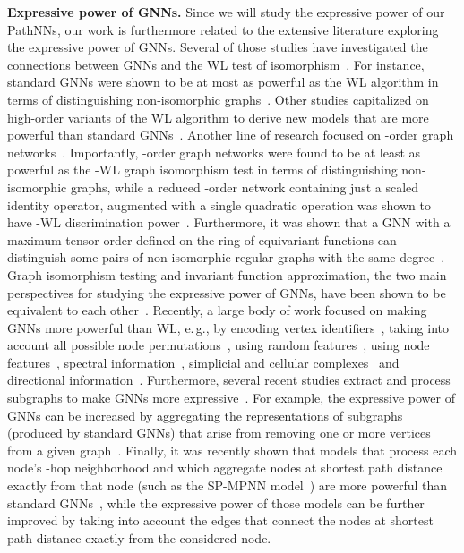 \documentclass{article}
\theoremstyle{plain}
\theoremstyle{definition}
\theoremstyle{remark}
\newcommand{\eg}{e.\,g., }
\begin{document}
\textbf{Expressive power of GNNs.}
Since we will study the expressive power of our PathNNs, our work is furthermore related to the extensive literature exploring the expressive power of GNNs.
Several of those studies have investigated the connections between GNNs and the WL test of isomorphism~\cite{barcelo2020logical,geerts2022expressiveness}.
For instance, standard GNNs were shown to be at most as powerful as the WL algorithm in terms of distinguishing non-isomorphic graphs~\cite{morris2019weisfeiler,xu2019powerful}.
Other studies capitalized on high-order variants of the WL algorithm to derive new models that are more powerful than standard GNNs~\cite{morris2019weisfeiler,morris2020weisfeiler}.
Another line of research focused on -order graph networks~\cite{maron2019invariant}.
Importantly, -order graph networks were found to be at least as powerful as the -WL graph isomorphism test in terms of distinguishing non-isomorphic graphs, while a reduced -order network containing just a scaled identity operator, augmented with a single quadratic operation was shown to have -WL discrimination power~\cite{maron2019provably}.
Furthermore, it was shown that a GNN with a maximum tensor order  defined on the ring of equivariant functions can distinguish some pairs of non-isomorphic regular graphs with the same degree~\cite{chen2019equivalence}.
Graph isomorphism testing and invariant function approximation, the two main perspectives for studying the expressive power of GNNs, have been shown to be equivalent to each other~\cite{chen2019equivalence}.
Recently, a large body of work focused on making GNNs more powerful than WL, \eg by encoding vertex identifiers~\cite{vignac2020building}, taking into account all possible node permutations~\cite{murphy2019relational,dasoulas2020coloring}, using random features~\cite{sato2021random,abboud2021surprising}, using node features~\cite{you2021identity}, spectral information~\cite{balcilar2021breaking}, simplicial and cellular complexes~\cite{bodnar2021weisfeiler,bodnar2021weisfeiler2} and directional information~\cite{beaini2021directional}.
Furthermore, several recent studies extract and process subgraphs to make GNNs more expressive~\cite{nikolentzos2020k,bevilacqua2022equivariant}.
For example, the expressive power of GNNs can be increased by aggregating the representations of subgraphs (produced by standard GNNs) that arise from removing one or more vertices from a given graph~\cite{cotta2021reconstruction,papp2021dropgnn}.
Finally, it was recently shown that models that process each node's -hop neighborhood and which aggregate nodes at shortest path distance exactly  from that node (such as the SP-MPNN model~\cite{abboud2022shortest}) are more powerful than standard GNNs~\cite{feng2022powerful}, while the expressive power of those models can be further improved by taking into account the edges that connect the nodes at shortest path distance exactly  from the considered node.
\end{document}
